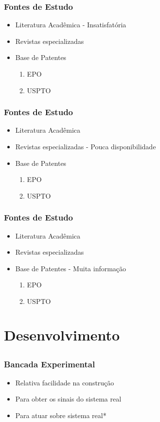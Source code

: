 \documentclass{beamer}
\begin{document}
\begin{frame}
  \frametitle{Fontes de Estudo}
  \begin{itemize}%
    \item Literatura Acadêmica - Insatisfatória
    \item Revistas especializadas
    \item Base de Patentes
      \begin{enumerate}
        \item EPO
        \item USPTO
      \end{enumerate}
  \end{itemize}
\end{frame}

\begin{frame}
  \frametitle{Fontes de Estudo}
  \begin{itemize}%
    \item Literatura Acadêmica
    \item Revistas especializadas - Pouca disponibilidade
    \item Base de Patentes
      \begin{enumerate}
        \item EPO
        \item USPTO
      \end{enumerate}
  \end{itemize}
\end{frame}

\begin{frame}
  \frametitle{Fontes de Estudo}
  \begin{itemize}%
    \item Literatura Acadêmica
    \item Revistas especializadas
    \item Base de Patentes - Muita informação
      \begin{enumerate}
        \item EPO
        \item USPTO
      \end{enumerate}
  \end{itemize}
\end{frame}

\section{Desenvolvimento}
\subsection{}
\begin{frame}
  \frametitle{Bancada Experimental}
  \begin{itemize}
    \item Relativa facilidade na construção
    \item Para obter os sinais do sistema real
    \item Para atuar sobre sistema real*
  \end{itemize}
\end{frame}
\end{document}
